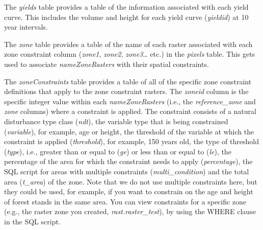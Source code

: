 \documentclass[
]{article}
\begin{document}
The \emph{yields} table provides a table of the information associated
with each yield curve. This includes the volume and height for each
yield curve (\emph{yieldid}) at 10 year intervals.

The \emph{zone} table provides a table of the name of each raster
associated with each zone constraint column (\emph{zone1}, \emph{zone2},
\emph{zone3}\ldots{} etc.) in the \emph{pixels} table. This gets used to
associate \emph{nameZoneRasters} with their spatial constraints.

The \emph{zoneConstraints} table provides a table of all of the specific
zone constraint definitions that apply to the zone constraint rasters.
The \emph{zoneid} column is the specific integer value within each
\emph{nameZoneRasters} (i.e., the \emph{reference\_zone} and \emph{zone}
columns) where a constraint is applied. The constraint consists of a
natural disturbance type class (\emph{ndt}), the variable type that is
being constrained (\emph{variable}), for example, age or height, the
threshold of the variable at which the constraint is applied
(\emph{threshold}), for example, 150 years old, the type of threshold
(\emph{type}), i.e., greater than or equal to (\emph{ge}) or less than
or equal to (\emph{le}), the percentage of the area for which the
constraint needs to apply (\emph{percentage}), the SQL script for areas
with multiple constraints (\emph{multi\_condition}) and the total area
(\emph{t\_area}) of the zone. Note that we do not use multiple
constraints here, but they could be used, for example, if you want to
constrain on the age and height of forest stands in the same area. You
can view constraints for a specific zone (e.g., the raster zone you
created, \emph{rast.raster\_test}), by using the WHERE clause in the SQL
script.
\end{document}
